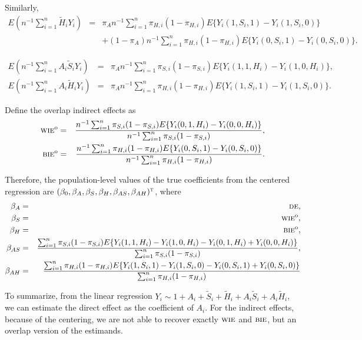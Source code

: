 \documentclass{article}
\def\T{{\textsc{t}}}
\newcommand{\tS}{\tilde{S}}
\newcommand{\tH}{\tilde{H}}
\newcommand{\sumi}{\sum_{i=1}^n}
\newcommand{\de}{\textsc{de}}
\newcommand{\bie}{\textsc{bie}}
\newcommand{\wie}{\textsc{wie}}
\begin{document}
Similarly, 
\begin{eqnarray*}
    E\left(n^{-1}\sumi \tH_i Y_i \right) &=& \pi_A n^{-1}\sumi \pi_{H,i}(1-\pi_{H,i}) E\{Y_i(1,S_i,1) - Y_i(1,S_i,0)\} \\
    &&+ (1-\pi_A) n^{-1}\sumi \pi_{H,i}(1-\pi_{H,i}) E\{Y_i(0,S_i,1) - Y_i(0,S_i,0)\}.
\end{eqnarray*}

\begin{eqnarray*}
    E\left(n^{-1}\sumi A_i \tS_i Y_i \right) &=& \pi_A n^{-1}\sumi \pi_{S,i}(1-\pi_{S,i}) E\{Y_i(1,1,H_i) - Y_i(1,0,H_i)\}, \\
    E\left(n^{-1}\sumi A_i \tH_i Y_i \right) &=& \pi_A n^{-1}\sumi \pi_{H,i}(1-\pi_{H,i}) E\{Y_i(1,S_i,1) - Y_i(1,S_i,0)\}.
\end{eqnarray*}

Define the overlap indirect effects as
\begin{eqnarray*}
    \wie^{\textup{o}} &=& \frac{n^{-1}\sumi \pi_{S,i}(1-\pi_{S,i})E\{Y_i(0,1,H_i)-Y_i(0,0,H_i)\}}{n^{-1}\sumi \pi_{S,i}(1-\pi_{S,i})}, \\
    \bie^{\textup{o}} &=& \frac{n^{-1}\sumi \pi_{H,i}(1-\pi_{H,i})E\{Y_i(0,S_i,1)-Y_i(0,S_i,0)\}}{n^{-1}\sumi \pi_{H,i}(1-\pi_{H,i})}.
\end{eqnarray*}

Therefore, the population-level values of the true coefficients from the centered regression are $(\beta_0, \beta_{A}, \beta_{S}, \beta_{H}, \beta_{AS}, \beta_{AH})^{\T}$, where
\begin{eqnarray*}
    \beta_{A} &=& \de, \\
    \beta_{S} &=& \wie^{\textup{o}}, \\
    \beta_{H} &=& \bie^{\textup{o}}, \\
    \beta_{AS} &=& \frac{\sumi \pi_{S,i}(1-\pi_{S,i}) E\{Y_i(1,1,H_i) - Y_i(1,0,H_i) - Y_i(0,1,H_i) + Y_i(0,0,H_i)\}}{\sumi \pi_{S,i}(1-\pi_{S,i})}, \\
    \beta_{AH} &=& \frac{\sumi \pi_{H,i}(1-\pi_{H,i}) E\{Y_i(1,S_i,1) - Y_i(1,S_i,0) - Y_i(0,S_i,1) + Y_i(0,S_i,0)\}}{\sumi \pi_{H,i}(1-\pi_{H,i})}
\end{eqnarray*}

To summarize, from the linear regression $Y_i \sim 1+A_i + \tS_i + \tH_i +A_i\tS_i + A_i \tH_i$, we can estimate the direct effect as the coefficient of $A_i$. For the indirect effects, because of the centering, we are not able to recover exactly $\wie$ and $\bie$, but an overlap version of the estimands.
\end{document}
